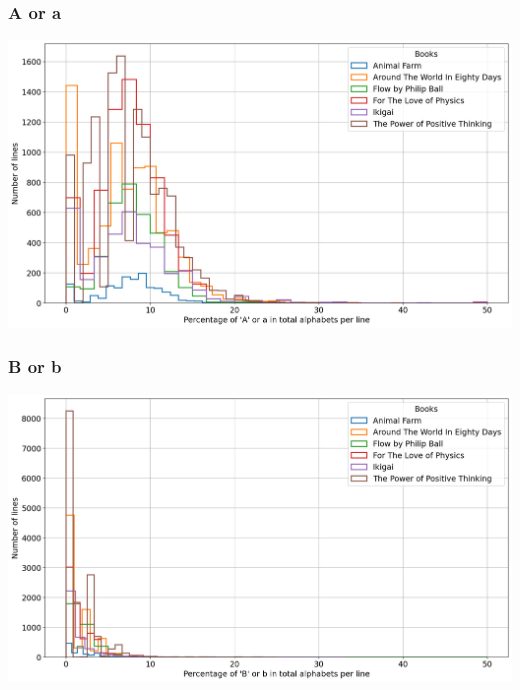 \begin{frame}
    \frametitle{A or a}
    \begin{center}
        \hspace*{-5ex}
        \includegraphics[scale=0.35]{../01_programFiles/histograms/a.png}\hspace{10ex}
    \end{center}
\end{frame}

\begin{frame}
    \frametitle{B or b}
    \begin{center}
        \hspace*{-5ex}
        \includegraphics[scale=0.35]{../01_programFiles/histograms/b.png}\hspace{10ex}
    \end{center}
\end{frame}

